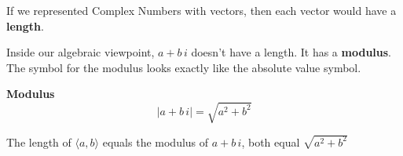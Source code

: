 \documentclass{ximera}
\begin{document}
If we represented Complex Numbers with vectors, then each vector would have a \textbf{length}.  


Inside our algebraic viewpoint, $a + b \, i$ doesn't have a length. It has a \textbf{modulus}.  The symbol for the modulus looks exactly like the absolute value symbol.

\begin{definition} \textbf{\textcolor{green!50!black}{Modulus}} 
\[      |a + b \, i|    = \sqrt{a^2 + b^2}   \]
\end{definition}

The length of $\langle a, b \rangle$ equals the modulus of $a + b \, i$, both equal $\sqrt{a^2 + b^2}$
\end{document}
